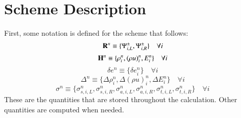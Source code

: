 \section{Scheme Description}

First, some notation is defined for the scheme that follows:
\[
   \mathbf{R}^n \equiv \{\Psi^\pm_{i,L},\Psi^\pm_{i,R}\} \quad\forall i
\]
\[
   \mathbf{H}^n \equiv \{\rho_i^n, (\rho u)_i^n, E_i^n\} \quad\forall i
\]
\[
   \delta e^n \equiv \{\delta e_i^n\} \quad\forall i
\]
\[
   \Delta^n \equiv \{\Delta\rho_i^n, \Delta(\rho u)_i^n, \Delta E_i^n\} \quad\forall i
\]
\[
   \sigma^n \equiv \{\sigma_{s,i,L}^n, \sigma_{s,i,R}^n,
   \sigma_{a,i,L}^n, \sigma_{a,i,R}^n, \sigma_{t,i,L}^n, \sigma_{t,i,R}^n\}
   \quad\forall i
\]
These are the quantities that are stored throughout the
calculation. Other quantities are computed when needed.

